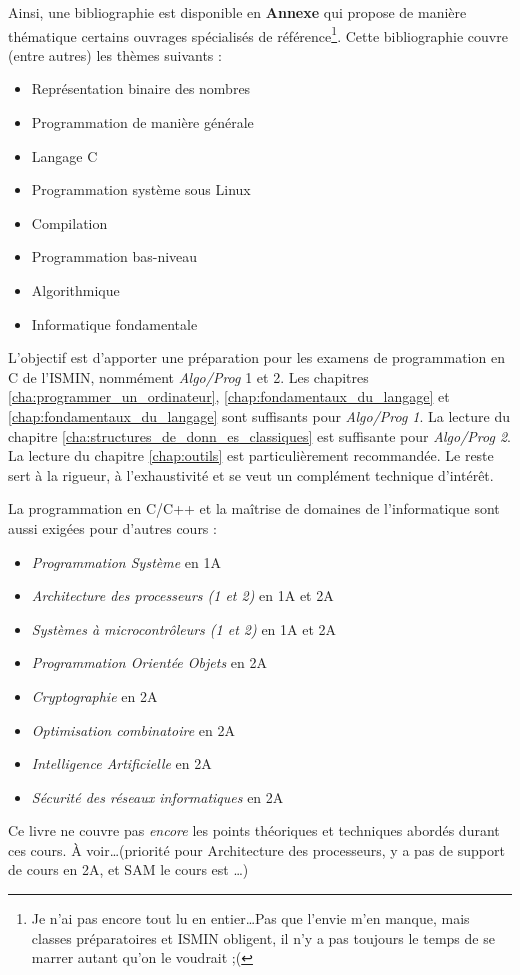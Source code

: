 \documentclass[../main.tex]{subfiles}
\begin{document}
Ainsi, une bibliographie est disponible en \textbf{Annexe} qui propose de manière thématique certains ouvrages spécialisés de référence\footnote{Je n'ai pas encore tout lu en entier\dots Pas que l'envie m'en manque, mais classes préparatoires et ISMIN obligent, il n'y a pas toujours le temps de se marrer autant qu'on le voudrait ;(}. Cette bibliographie couvre (entre autres) les thèmes suivants :
\begin{itemize}
	\item Représentation binaire des nombres \cite{MullerEtAl2018}\cite{BitHacks}
	\item Programmation de manière générale \cite{EoP}
	\item Langage C \cite{KR}\cite{MSRC}\cite{c11}
	\item Programmation système sous Linux \cite{LPI}
	\item Compilation \cite{gnumake}\cite{LL}\cite{AL}\cite{Aho}
	\item Programmation bas-niveau \cite{CSaPP}
	\item Algorithmique \cite{EltAlgorithmie}\cite{TAOCP}
	\item Informatique fondamentale \cite{ONotation}\cite{XFI}
\end{itemize}

L'objectif est d'apporter une préparation pour les examens de programmation en C de l'ISMIN, nommément \textit{Algo/Prog} 1 et 2. Les chapitres \ref{cha:programmer_un_ordinateur}, \ref{chap:fondamentaux_du_langage} et \ref{chap:fondamentaux_du_langage} sont suffisants pour \textit{Algo/Prog 1}. La lecture du chapitre \ref{cha:structures_de_donn_es_classiques} est suffisante pour \textit{Algo/Prog 2}. La lecture du chapitre \ref{chap:outils} est particulièrement recommandée. Le reste sert à la rigueur, à l'exhaustivité et se veut un complément technique d'intérêt.

La programmation en C/C++ et la maîtrise de domaines de l'informatique sont aussi exigées pour d'autres cours :
\begin{itemize}
	\item \textit{Programmation Système} en 1A
	\item \textit{Architecture des processeurs (1 et 2)} en 1A et 2A
	\item \textit{Systèmes à microcontrôleurs (1 et 2)} en 1A et 2A
	\item \textit{Programmation Orientée Objets} en 2A
	\item \textit{Cryptographie} en 2A
	\item \textit{Optimisation combinatoire} en 2A
	\item \textit{Intelligence Artificielle} en 2A
	\item \textit{Sécurité des réseaux informatiques} en 2A
\end{itemize}
Ce livre ne couvre pas \textit{encore} les points théoriques et techniques abordés durant ces cours. À voir\dots (priorité pour Architecture des processeurs, y a pas de support de cours en 2A, et SAM le cours est \dots)
\end{document}
